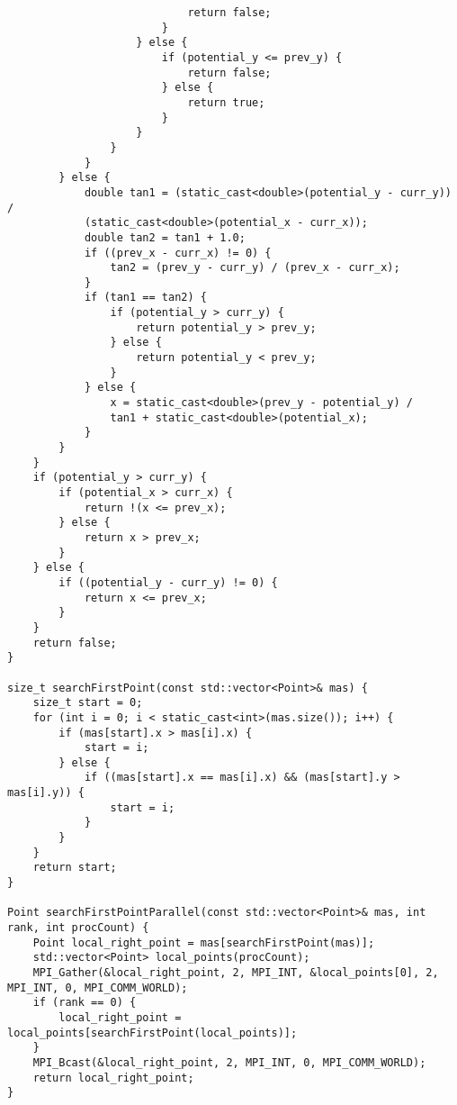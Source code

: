 \documentclass{report}
\begin{document}
\begin{lstlisting}
                            return false;
                        }
                    } else {
                        if (potential_y <= prev_y) {
                            return false;
                        } else {
                            return true;
                        }
                    }
                }
            }
        } else {
            double tan1 = (static_cast<double>(potential_y - curr_y)) /
            (static_cast<double>(potential_x - curr_x));
            double tan2 = tan1 + 1.0;
            if ((prev_x - curr_x) != 0) {
                tan2 = (prev_y - curr_y) / (prev_x - curr_x);
            }
            if (tan1 == tan2) {
                if (potential_y > curr_y) {
                    return potential_y > prev_y;
                } else {
                    return potential_y < prev_y;
                }
            } else {
                x = static_cast<double>(prev_y - potential_y) /
                tan1 + static_cast<double>(potential_x);
            }
        }
    }
    if (potential_y > curr_y) {
        if (potential_x > curr_x) {
            return !(x <= prev_x);
        } else {
            return x > prev_x;
        }
    } else {
        if ((potential_y - curr_y) != 0) {
            return x <= prev_x;
        }
    }
    return false;
}

size_t searchFirstPoint(const std::vector<Point>& mas) {
    size_t start = 0;
    for (int i = 0; i < static_cast<int>(mas.size()); i++) {
        if (mas[start].x > mas[i].x) {
            start = i;
        } else {
            if ((mas[start].x == mas[i].x) && (mas[start].y > mas[i].y)) {
                start = i;
            }
        }
    }
    return start;
}

Point searchFirstPointParallel(const std::vector<Point>& mas, int rank, int procCount) {
    Point local_right_point = mas[searchFirstPoint(mas)];
    std::vector<Point> local_points(procCount);
    MPI_Gather(&local_right_point, 2, MPI_INT, &local_points[0], 2, MPI_INT, 0, MPI_COMM_WORLD);
    if (rank == 0) {
        local_right_point = local_points[searchFirstPoint(local_points)];
    }
    MPI_Bcast(&local_right_point, 2, MPI_INT, 0, MPI_COMM_WORLD);
    return local_right_point;
}


\end{lstlisting}
\end{document}
